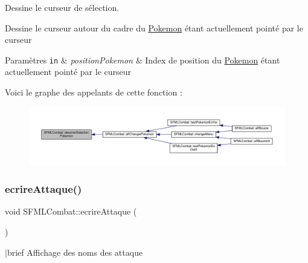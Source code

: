 Dessine le curseur de sélection. 

Dessine le curseur autour du cadre du \hyperlink{class_pokemon}{Pokemon} étant actuellement pointé par le curseur 
\begin{DoxyParams}[1]{Paramètres}
\mbox{\tt in}  & {\em position\+Pokemon} & Index de position du \hyperlink{class_pokemon}{Pokemon} étant actuellement pointé par le curseur \\
\hline
\end{DoxyParams}
Voici le graphe des appelants de cette fonction \+:\nopagebreak
\begin{figure}[H]
\begin{center}
\leavevmode
\includegraphics[width=350pt]{class_s_f_m_l_combat_ab37fca053d9f0e3529502c69f0de1055_icgraph}
\end{center}
\end{figure}
\mbox{\label{class_s_f_m_l_combat_a83899ae7d061225976857060d2a16388}} 
\subsubsection{\texorpdfstring{ecrire\+Attaque()}{ecrireAttaque()}}
{\footnotesize\ttfamily void S\+F\+M\+L\+Combat\+::ecrire\+Attaque (\begin{DoxyParamCaption}{ }\end{DoxyParamCaption})\hspace{0.3cm}{\ttfamily [private]}}

$\vert$brief Affichage des noms des attaque


